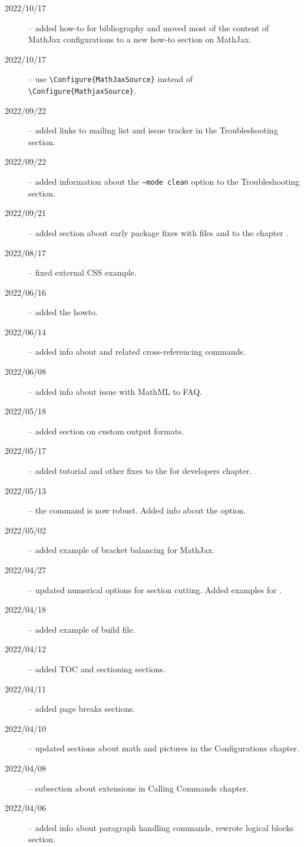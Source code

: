 
\begin{description}
  \item[2022/10/17] -- added how-to for bibliography and moved most of the content of MathJax configurations to a new how-to section on MathJax. 
  \item[2022/10/17] -- use \verb|\Configure{MathJaxSource}| instead of \verb|\Configure{MathjaxSource}|.
  \item[2022/09/22] -- added links to mailing list and issue tracker in the Troubleshooting section.
  \item[2022/09/22] -- added information about the \texttt{--mode clean} option to the Troubleshooting section.
  \item[2022/09/21] -- added section about early package fixes with  files and  to the chapter .
  \item[2022/08/17] -- fixed external CSS example.
  \item[2022/06/16] -- added the  howto.
  \item[2022/06/14] -- added info about  and related cross-referencing commands.
  \item[2022/06/08] -- added info about  issue with MathML to FAQ.
  \item[2022/05/18] -- added section on custom output formats.
  \item[2022/05/17] -- added tutorial and other fixes to the for developers chapter.
  \item[2022/05/13] -- the  command is now robust. Added info about the  option.
  \item[2022/05/02] -- added example of bracket balancing for MathJax.
  \item[2022/04/27] -- updated numerical options for section cutting. Added examples for .
  \item[2022/04/18] -- added example of \makefourht{} build file.
  \item[2022/04/12] -- added TOC and sectioning sections.
  \item[2022/04/11] -- added page breaks sections.
  \item[2022/04/10] -- updated sections about math and pictures in the Configurations chapter.
  \item[2022/04/08] -- subsection about \makefourht{} extensions in Calling Commands chapter.
  \item[2022/04/06] -- added info about paragraph handling commands, rewrote logical blocks section.

\end{description}
